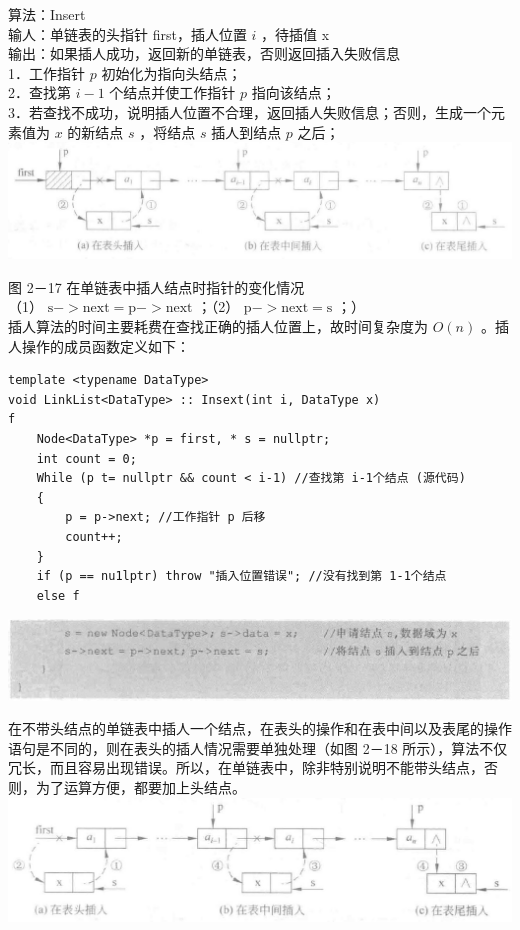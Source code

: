 \documentclass[10pt]{article}
\begin{document}
算法：Insert\\
输人：单链表的头指针 first，插人位置 $i$ ，待插值 x\\
输出：如果插人成功，返回新的单链表，否则返回插入失败信息\\
1．工作指针 $p$ 初始化为指向头结点；\\
2．查找第 $i-1$ 个结点并使工作指针 $p$ 指向该结点；\\
3．若查找不成功，说明插人位置不合理，返回插人失败信息；否则，生成一个元素值为 $x$ 的新结点 $s$ ，将结点 $s$ 插人到结点 $p$ 之后；\\
\includegraphics[max width=\textwidth, center]{2025_06_06_704745ea57b15b2333e5g-057(1)}

图 2－17 在单链表中插人结点时指针的变化情况\\
（1） $\mathrm{s}->\mathrm{next}=\mathrm{p}->\mathrm{next}$ ；（2） $\mathrm{p}->\mathrm{next}=\mathrm{s}$ ；）\\
插人算法的时间主要耗费在查找正确的插人位置上，故时间复杂度为 $O(n)$ 。插人操作的成员函数定义如下：

\begin{verbatim}
template <typename DataType>
void LinkList<DataType> :: Insext(int i, DataType x)
f
    Node<DataType> *p = first, * s = nullptr;
    int count = 0;
    While (p t= nullptr && count < i-1) //查找第 i-1个结点 (源代码)
    {
        p = p->next; //工作指针 p 后移
        count++;
    }
    if (p == nu1lptr) throw "插入位置错误"; //没有找到第 1-1个结点
    else f
\end{verbatim}

\begin{center}
\includegraphics[max width=\textwidth]{2025_06_06_704745ea57b15b2333e5g-058(1)}
\end{center}

在不带头结点的单链表中插人一个结点，在表头的操作和在表中间以及表尾的操作语句是不同的，则在表头的插人情况需要单独处理（如图 2－18 所示），算法不仅冗长，而且容易出现错误。所以，在单链表中，除非特别说明不能带头结点，否则，为了运算方便，都要加上头结点。\\
\includegraphics[max width=\textwidth, center]{2025_06_06_704745ea57b15b2333e5g-058}
\end{document}
